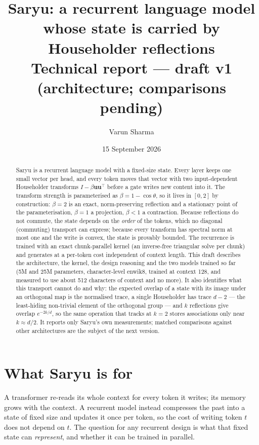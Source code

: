 \documentclass[10pt]{article}
\title{\textbf{Saryu: a recurrent language model whose state is carried by Householder reflections}\\[4pt]
\large Technical report --- draft v1 (architecture; comparisons pending)}
\author{Varun Sharma}
\date{15 September 2026}
\newcommand{\bu}{\mathbf{u}}
\begin{document}
\maketitle

\begin{abstract}
Saryu is a recurrent language model with a fixed-size state. Every layer keeps one small vector per
head, and every token moves that vector with two input-dependent Householder transforms
$I-\beta\bu\bu^\top$ before a gate writes new content into it. The transform strength is parameterised
as $\beta = 1-\cos\theta$, so it lives in $[0,2]$ by construction: $\beta=2$ is an exact, norm-preserving
reflection and a stationary point of the parameterisation, $\beta=1$ a projection, $\beta<1$ a
contraction. Because reflections do not commute, the state depends on the \emph{order} of the tokens,
which no diagonal (commuting) transport can express; because every transform has spectral norm at most one and
the write is convex, the state is provably bounded. The recurrence is trained with an exact
chunk-parallel kernel (an inverse-free triangular solve per chunk) and generates at a per-token cost
independent of context length. This draft describes the architecture, the kernel, the design
reasoning and the two models trained so far (5M and 25M parameters, character-level enwik8, trained
at context 128, and measured to use about 512 characters of context and no more). It also identifies what this transport cannot do and why: the expected overlap of a state with its
image under an orthogonal map is the normalised trace, a single Householder has trace $d-2$ --- the
least-hiding non-trivial element of the orthogonal group --- and $k$ reflections give overlap
$e^{-2k/d}$, so the same operation that tracks at $k=2$ stores associations only near $k\approx d/2$.
It reports only Saryu's own measurements;
matched comparisons against other architectures are the subject of the next version.
\end{abstract}

\section{What Saryu is for}

A transformer re-reads its whole context for every token it writes; its memory grows with the
context. A recurrent model instead compresses the past into a state of fixed size and updates it once
per token, so the cost of writing token $t$ does not depend on $t$. The question for any recurrent
design is what that fixed state can \emph{represent}, and whether it can be trained in parallel.
\end{document}
